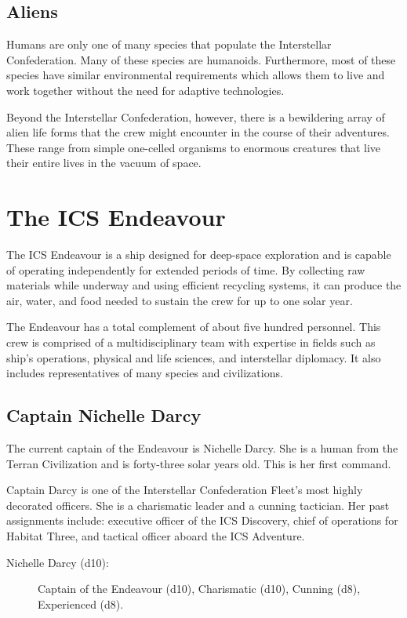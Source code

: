 \documentclass[11pt, a5paper, parskip=half-, DIV=12]{scrartcl}
\begin{document}
\subsection*{Aliens}
Humans are only one of many species that populate the Interstellar Confederation. Many of these species are humanoids. Furthermore, most of these species have similar environmental requirements which allows them to live and work together without the need for adaptive technologies.

Beyond the Interstellar Confederation, however, there is a bewildering array of alien life forms that the crew might encounter in the course of their adventures. These range from simple one-celled organisms to enormous creatures that live their entire lives in the vacuum of space.

\newpage

\section*{The ICS Endeavour}
The ICS Endeavour is a ship designed for deep-space exploration and is capable of operating independently for extended periods of time. By collecting raw materials while underway and using efficient recycling systems, it can produce the air, water, and food needed to sustain the crew for up to one solar year.

The Endeavour has a total complement of about five hundred personnel. This crew is comprised of a multidisciplinary team with expertise in fields such as ship's operations, physical and life sciences, and interstellar diplomacy. It also includes representatives of many species and civilizations.

\subsection*{Captain Nichelle Darcy}
The current captain of the Endeavour is Nichelle Darcy. She is a human from the Terran Civilization and is forty-three solar years old. This is her first command.

Captain Darcy is one of the Interstellar Confederation Fleet's most highly decorated officers. She is a charismatic leader and a cunning tactician. Her past assignments include: executive officer of the ICS Discovery, chief of operations for Habitat Three, and tactical officer aboard the ICS Adventure.

\begin{description}
	\item[Nichelle Darcy (d10):] Captain of the Endeavour (d10), Charismatic (d10), Cunning (d8), Experienced (d8).
\end{description}
\end{document}
